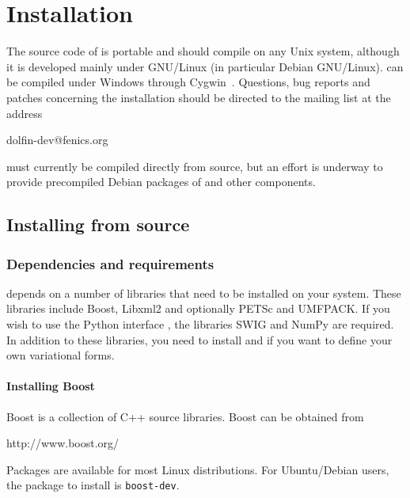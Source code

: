 \chapter{Installation}
\label{app:installation}

The source code of \dolfin{} is portable and should compile on any
Unix system, although it is developed mainly under GNU/Linux (in 
particular Debian GNU/Linux). \dolfin{} can be compiled under Windows
through Cygwin~\cite{www:Cygwin}. Questions, bug reports and patches
concerning the installation should be directed to the \dolfin{} mailing 
list at the address
\begin{code}
dolfin-dev@fenics.org
\end{code}

\dolfin{} must currently be compiled directly from source, but an effort
is underway to provide precompiled Debian packages of \dolfin{} and
other \fenics{} components.

\section{Installing from source}

\subsection{Dependencies and requirements}

\dolfin{} depends on a number of libraries that need to be installed on your
system. These libraries include Boost, Libxml2 and optionally PETSc and UMFPACK. 
If you wish to use the Python interface \pydolfin{}, the libraries SWIG 
and NumPy are required. In addition to these 
libraries, you need to install \fiat{} and \ffc{} if you want to define your 
own variational forms.

\subsubsection{Installing Boost}

Boost is a collection of C++ source libraries. Boost can be obtained from
\begin{code}
http://www.boost.org/
\end{code}
Packages are available for most Linux distributions. For Ubuntu/Debian users, the 
package to install is \texttt{boost-dev}.

